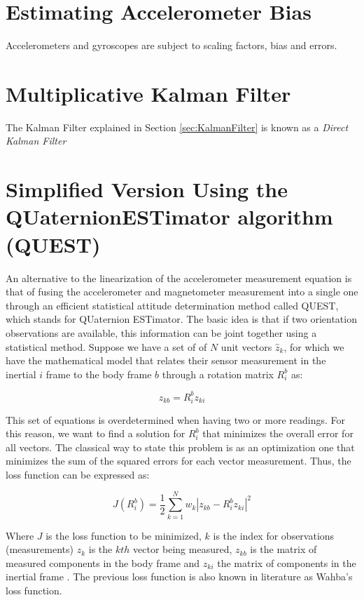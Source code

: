 \documentclass[a4paper,10pt]{article}
\begin{document}
 \newpage

\section{Estimating Accelerometer Bias}
Accelerometers and gyroscopes are subject to scaling factors, bias and errors.

\section{Multiplicative Kalman Filter}
The Kalman Filter explained in Section \ref{sec:KalmanFilter} is known as a \emph{Direct Kalman Filter} 


\section{Simplified Version Using the QUaternionESTimator algorithm (QUEST)}
\label{sect:questSection}
An alternative to the linearization of the accelerometer measurement equation is that of fusing the accelerometer and magnetometer measurement into a single one through an efficient statistical attitude determination method called QUEST, which stands for QUaternion ESTimator. The basic idea is that if two orientation observations are available, this information can be joint together using a statistical method. Suppose we have a set of of $N$ unit vectors $\hat{z}_k$, for which we have the mathematical model	 that relates their sensor measurement in the inertial ${i}$ frame to the body frame ${b}$ through a rotation matrix $R^b_i$ as:

\begin{equation}
 z_{kb} = R^b_i z_{ki}
\end{equation}

This set of equations is overdetermined when having two or more readings. For this reason, we want to find a solution for $R^b_i$ that minimizes the overall error for all vectors. The classical way to state this problem is as an optimization one that minimizes the sum of the squared errors for each vector measurement. Thus, the loss function can be expressed as:

\begin{equation}
 J(R^b_i) = \frac{1}{2}  \sum^{N}_{k=1}  w_k \left| z_{kb} - R^b_i z_{ki} \right|^2 
\end{equation}

Where $J$ is the loss function to be minimized, $k$ is the index for observations (measurements) $z_{k}$ is the $kth$ vector being measured, $z_{kb}$ is the matrix of measured components in the body frame and $z_{ki}$ the matrix of components in the inertial frame \cite{HallNotes2003}. The previous loss function is also known in literature as Wahba's loss function. 
\end{document}
